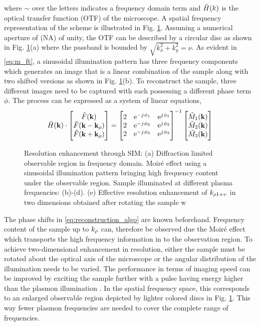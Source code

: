 \documentclass[11pt]{article}
\begin{document}
%
where $\sim$ over the letters indicates a frequency domain term and $\tilde{H}(k)$ is the optical transfer function (OTF) of the microscope. A spatial frequency representation of the scheme is illustrated in Fig. \ref{fig:sim}. Assuming a numerical aperture of (NA) of unity, the OTF can be described by a circular disc as shown in Fig. \ref{fig:sim}(a) where the passband is bounded by $\sqrt{k_x^2 + k_y^2} = \nu$. As evident in \eqref{eq:m_ft}, a sinusoidal illumination pattern has three frequency components which generates an image that is a linear combination of the sample along with two shifted versions as shown in Fig. \ref{fig:sim}(b). To reconstruct the sample, three different images need to be captured with each possessing a different phase term $\phi$. The process can be expressed as a system of linear equations,
%
\begin{equation}
  \tilde{H}(\mathbf{k}) \cdot
  \begin{bmatrix}
    \tilde{F}(\mathbf{k}) \\
    \tilde{F}(\mathbf{k} - \mathbf{k}_{\rho}) \\
    \tilde{F}(\mathbf{k} + \mathbf{k}_{\rho})
  \end{bmatrix}
  =
  \begin{bmatrix}
    2 & \mathrm{e}^{-j\mkern1mu \phi_1} & \mathrm{e}^{j\mkern1mu \phi_1} \\
    2 & \mathrm{e}^{-j\mkern1mu \phi_2} & \mathrm{e}^{j\mkern1mu \phi_2} \\
    2 & \mathrm{e}^{-j\mkern1mu \phi_3} & \mathrm{e}^{j\mkern1mu \phi_3} \\
  \end{bmatrix}^{-1}
  \begin{bmatrix}
   \tilde{M}_1(\mathbf{k}) \\
   \tilde{M}_2(\mathbf{k}) \\
   \tilde{M}_3(\mathbf{k})
  \end{bmatrix}
  \label{eq:reconstruction_algo}
\end{equation}
%
\begin{figure}[t!]
  \centering
  \def\svgwidth{.75\linewidth}
  
  \caption{Resolution enhancement through SIM: (a) Diffraction limited observable region in frequency domain.  Moiré effect using a sinusoidal illumination pattern bringing high frequency content under the observable region. Sample illuminated at different plasma frequencies: (b)-(d). (e) Effective resolution enhancement of $k_{\rho 1 + \upsilon}$ in two dimensions obtained after rotating the sample w}
  \label{fig:sim}
\end{figure}
%
The phase shifts in \eqref{eq:reconstruction_algo} are known beforehand. Frequency content of the sample up to $k_{\rho}$ can, therefore be observed due the Moiré effect which transports the high frequency information in to the observation region. To achieve two-dimensional enhancement in resolution, either the sample must be rotated about the optical axis of the microscope or the angular distribution of the illumination needs to be varied. The performance in terms of imaging speed can be improved by exciting the sample further with a pulse having energy higher than the plasmon illumination \cite{Zeng2015}. In the spatial frequency space, this corresponds to an enlarged observable region depicted by lighter colored discs in Fig. \ref{fig:sim}. This way fewer plasmon frequencies are needed to cover the complete range of frequencies.
\end{document}
